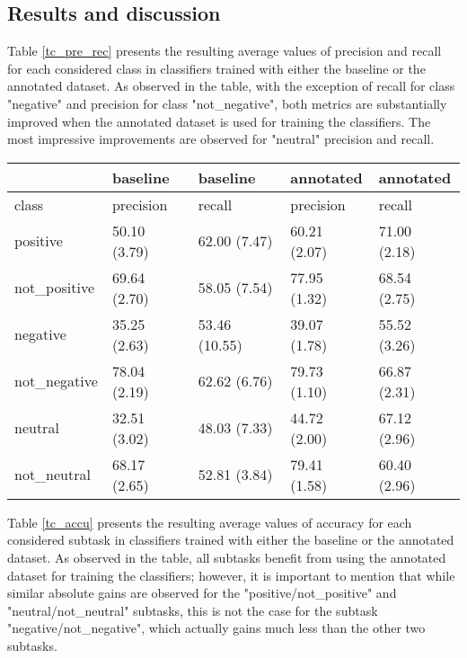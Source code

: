 \subsection{Results and discussion}
Table \ref{tc_pre_rec} presents the resulting average values of precision and recall for each considered class 
in classifiers trained with either the baseline or the annotated dataset. As observed in the table, with the
exception of recall for class "negative" and precision for class "not\_negative", both metrics are substantially 
improved when the annotated dataset is used for training the classifiers. The most impressive improvements
are observed for "neutral" precision and recall. 

\begin{table*}
\begin{tabular}{|l|l|l|l|l|}
\hline
&baseline &baseline &annotated &annotated \\ 
\hline
class &precision &recall &precision &recall \\ 
\hline
positive &50.10 (3.79) &62.00 (7.47) &60.21 (2.07) &71.00 (2.18) \\ 
\hline
not\_positive &69.64 (2.70) &58.05 (7.54) &77.95 (1.32) &68.54 (2.75) \\ 
\hline
negative &35.25 (2.63) &53.46 (10.55) &39.07 (1.78) &55.52 (3.26) \\ 
\hline
not\_negative &78.04 (2.19) &62.62 (6.76) &79.73 (1.10) &66.87 (2.31) \\ 
\hline
neutral &32.51 (3.02) &48.03 (7.33) &44.72 (2.00) &67.12 (2.96) \\ 
\hline
not\_neutral &68.17 (2.65) &52.81 (3.84) &79.41 (1.58) &60.40 (2.96) \\ 
\hline
\end{tabular}
\caption{Average precision and average recall (with standard deviations provided in parenthesis) 
for each considered class in classifiers trained with either the baseline or the annotated dataset.}
\label{tc_pre_rec}
\end{table*}

Table \ref{tc_accu} presents the resulting average values of accuracy for each considered subtask 
in classifiers trained with either the baseline or the annotated dataset. As observed in the table,
all subtasks benefit from using the annotated dataset for training the classifiers; however, it is 
important to mention that while similar absolute gains are observed for the "positive/not\_positive" 
and "neutral/not\_neutral" subtasks, this is not the case for the subtask "negative/not\_negative", 
which actually gains much less than the other two subtasks.

